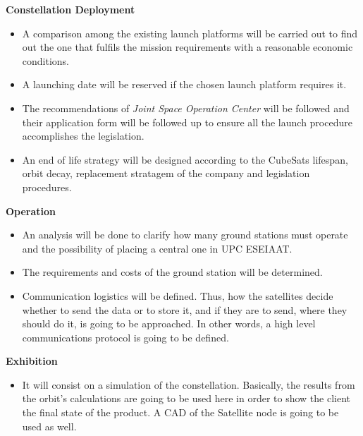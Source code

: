 {\bfseries Constellation Deployment} 

\begin{itemize}
	\item A comparison among the existing launch platforms will be carried out to find out the
one that fulfils the mission requirements with a reasonable economic conditions.
	\item A launching date will be reserved if the chosen launch platform requires it.
	\item The recommendations of \textit{Joint Space Operation Center} will be followed and their application form will be followed up to ensure all the launch procedure accomplishes the legislation.
 	\item An end of life strategy will be designed according to the CubeSats lifespan, orbit decay,
replacement stratagem of the company and legislation procedures.
\end{itemize}

{\bfseries Operation} 

\begin{itemize}
	\item An analysis will be done to clarify how many ground stations must operate and the possibility of placing a central one in UPC ESEIAAT.
	\item The requirements and costs of the ground station will be determined. 
	\item Communication logistics will be defined. Thus, how the satellites decide whether to send the data or to store it, and if they are to send, where they should do it, is going to be approached. In other words, a high level communications protocol is going to be defined. 
\end{itemize}

{\bfseries Exhibition}

\begin{itemize}
	\item It will consist on a simulation of the constellation. Basically, the results from the orbit’s calculations are going to be used here in order to show the client the final state of the product. A CAD of the Satellite node is going to be used as well.

\end{itemize}